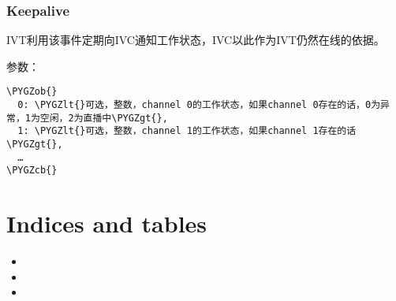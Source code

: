 \documentclass[letterpaper,10pt,english]{sphinxmanual}
\def\PYGZob{\char`\{}
\def\PYGZcb{\char`\}}
\def\PYGZlt{\char`\<}
\def\PYGZgt{\char`\>}
\begin{document}
\subsection{Keepalive}
\label{rpc:keepalive}
IVT利用该事件定期向IVC通知工作状态，IVC以此作为IVT仍然在线的依据。

参数：

\begin{Verbatim}[commandchars=\\\{\}]
\PYGZob{}
  0: \PYGZlt{}可选，整数，channel 0的工作状态，如果channel 0存在的话，0为异常，1为空闲，2为直播中\PYGZgt{},
  1: \PYGZlt{}可选，整数，channel 1的工作状态，如果channel 1存在的话\PYGZgt{},
  …
\PYGZcb{}
\end{Verbatim}


\chapter{Indices and tables}
\label{index:indices-and-tables}\begin{itemize}
\item {} 

\item {} 

\item {} 

\end{itemize}



\renewcommand{\indexname}{Index}
\printindex
\end{document}
